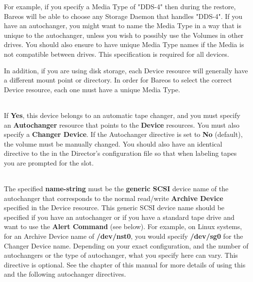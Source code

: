 \begin{description}
For example, if you specify a Media Type of "DDS-4" then during the
restore, Bareos will be able to choose any Storage Daemon that handles
"DDS-4".  If you have an autochanger, you might want to name the Media Type
in a way that is unique to the autochanger, unless you wish to possibly use
the Volumes in other drives.  You should also ensure to have unique Media
Type names if the Media is not compatible between drives.  This
specification is required for all devices.

In addition, if you are using disk storage, each Device resource will
generally have a different mount point or directory. In order for
Bareos to select the correct Device resource, each one must have a
unique Media Type.

\label{Autochanger}
\item [Autochanger = {\textless}yes{\textbar}no{\textgreater}] \hfill \\
If {\bf Yes}, this device belongs to an automatic tape changer, and you
must specify an {\bf Autochanger} resource that points to the {\bf
Device} resources.  You must also specify a
{\bf Changer Device}.  If the Autochanger directive is set to {\bf
No} (default), the volume must be manually changed.  You should also
have an identical directive to the
  in the Director's
configuration file so that  when labeling tapes you are prompted for the slot.

\item [Changer Device = {\textless}name-string{\textgreater}] \hfill \\
The specified {\bf name-string} must be the {\bf generic SCSI} device
name of the autochanger that corresponds to the normal read/write
{\bf Archive Device}  specified in the Device resource. This
generic SCSI device name should be specified if you have an autochanger
or if you have a standard tape drive and want to use the
{\bf Alert Command} (see below). For example, on Linux systems, for
an Archive Device name of {\bf /dev/nst0}, you would specify {\bf
/dev/sg0} for the Changer Device name. Depending on your exact
configuration, and the number of autochangers or the type of
autochanger, what you specify here can vary.  This directive is
optional.  See the  chapter
of this manual for more details of using this and the following
autochanger directives.


\end{description}
